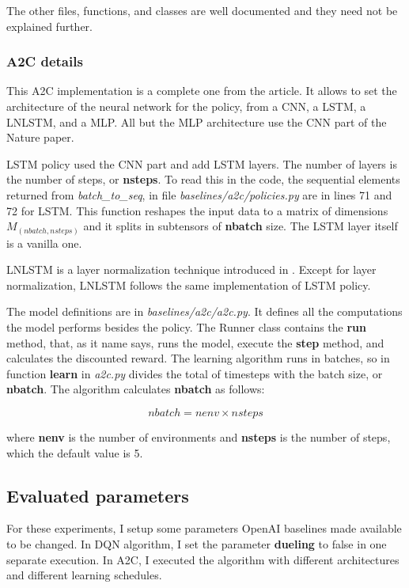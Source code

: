 \documentclass[11pt,twoside,a4paper]{article}
\begin{document}
The other files, functions, and classes are well documented and they need not be
explained further.

\subsubsection*{A2C details}

This A2C implementation is a complete one from the article. It allows to set
the architecture of the neural network for the policy, from a CNN, a LSTM, a
LNLSTM, and a MLP. All but the MLP architecture use the CNN part of the Nature
\cite{mnih2015humanlevel} paper.

LSTM policy used the CNN part and add LSTM layers. The number of layers is the
number of steps, or \textbf{nsteps}. To read this in the code, the sequential
elements returned from \textit{batch\_to\_seq}, in file
\textit{baselines/a2c/policies.py} are in lines 71 and 72 for LSTM. This
function reshapes the input data to a matrix of dimensions $ M_{(nbatch,nsteps)} $
and it splits in subtensors of \textbf{nbatch} size. The LSTM layer itself is
a vanilla one.

LNLSTM is a layer normalization technique introduced in \cite{LayerNorm}.
Except for layer normalization, LNLSTM follows the same implementation of LSTM
policy.

The model definitions are in \textit{baselines/a2c/a2c.py}. It defines all the
computations the model performs besides the policy. The Runner class contains
the \textbf{run} method, that, as it name says, runs the model, execute the
\textbf{step} method, and calculates the discounted reward. The learning
algorithm runs in batches, so in function \textbf{learn} in \textit{a2c.py}
divides the total of timesteps with the batch size, or \textbf{nbatch}. The
algorithm calculates \textbf{nbatch} as follows:

$$
nbatch = nenv \times nsteps
$$

where \textbf{nenv} is the number of environments and \textbf{nsteps} is the
number of steps, which the default value is 5.

\subsection*{Evaluated parameters}

For these experiments, I setup some parameters OpenAI baselines made available
to be changed. In DQN algorithm, I set the parameter \textbf{dueling} to false
in one separate execution. In A2C, I executed the algorithm with different
architectures and different learning schedules.
\end{document}
